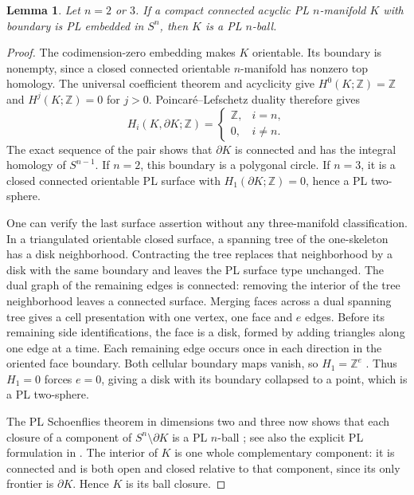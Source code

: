 \documentclass[11pt]{article}
\newtheorem{lemma}[theorem]{Lemma}
\theoremstyle{remark}
\newcommand{\Z}{\mathbb Z}
\newcommand{\bd}{\partial}
\begin{document}
\begin{lemma}\label{lem:lowball}
Let $n=2$ or $3$. If a compact connected acyclic PL $n$-manifold $K$ with
boundary is PL embedded in $S^n$, then $K$ is a PL $n$-ball.
\end{lemma}

\begin{proof}
The codimension-zero embedding makes $K$ orientable. Its boundary is
nonempty, since a closed connected orientable $n$-manifold has nonzero top
homology. The universal coefficient theorem
\cite[Theorem~3.2, p.~195]{Hatcher} and acyclicity give
$H^0(K;\Z)=\Z$ and $H^j(K;\Z)=0$ for $j>0$. Poincar\'e--Lefschetz
duality \cite[Theorem~3.43, p.~254]{Hatcher} therefore gives
\[
 H_i(K,\bd K;\Z)=
 \begin{cases}\Z,&i=n,\\0,&i\neq n.\end{cases}
\]
The exact sequence of the pair shows that $\bd K$ is connected and has
the integral homology of $S^{n-1}$. If $n=2$, this boundary is a polygonal
circle. If $n=3$, it is a closed connected orientable PL surface with
$H_1(\bd K;\Z)=0$, hence a PL two-sphere.

One can verify the last surface assertion without any three-manifold
classification. In a triangulated orientable closed surface, a spanning
tree of the one-skeleton has a disk neighborhood. Contracting the tree
replaces that neighborhood by a disk with the same boundary and leaves
the PL surface type unchanged. The dual graph of the remaining edges is
connected: removing the interior of the tree neighborhood leaves a
connected surface. Merging faces across a dual spanning tree gives a
cell presentation with one vertex, one face and $e$ edges. Before its
remaining side identifications, the face is a disk, formed by adding
triangles along one edge at a time. Each remaining edge occurs once in
each direction in the oriented face boundary. Both cellular boundary maps
vanish, so $H_1=\Z^e$ \cite[Theorem~2.35, pp.~138--139]{Hatcher}.
Thus $H_1=0$ forces $e=0$, giving a disk with its boundary collapsed to
a point, which is a PL two-sphere.

The PL Schoenflies theorem in dimensions two and three now shows that
each closure of a component of $S^n\setminus\bd K$ is a PL $n$-ball
\cite[pp.~47--49]{RS}; see also the explicit PL formulation in
\cite[pp.~1--2]{Hatcher3}. The interior of $K$ is one whole complementary
component: it is connected and is both open and closed relative to that
component, since its only frontier is $\bd K$. Hence $K$ is its ball closure.
\end{proof}
\end{document}
